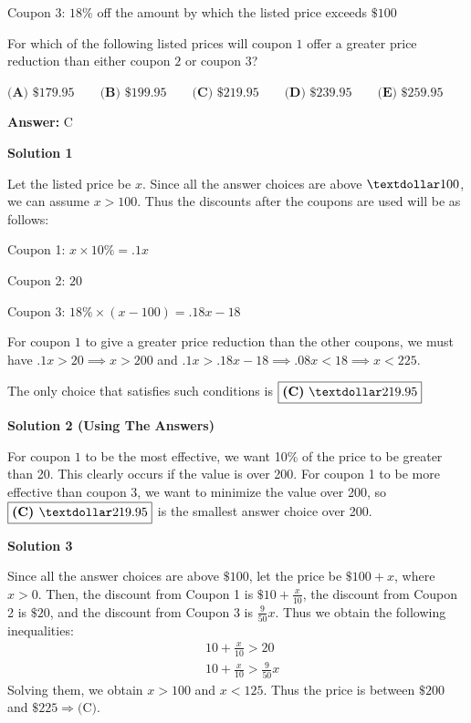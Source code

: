 \begin{enumerate}
 Coupon 3: $18\%$ off the amount by which the listed price exceeds $\$100$


 For which of the following listed prices will coupon $1$ offer a greater price reduction than either coupon $2$ or coupon $3$?


 $\textbf{(A) }\$179.95\qquad \textbf{(B) }\$199.95\qquad \textbf{(C) }\$219.95\qquad \textbf{(D) }\$239.95\qquad \textbf{(E) }\$259.95\qquad$

 \textbf{Answer: }C



\textbf{Solution 1}

Let the listed price be $x$. Since all the answer choices are above $\textdollar100$, we can assume $x > 100$. Thus the discounts after the coupons are used will be as follows:

 Coupon 1: $x\times10\%=.1x$

 Coupon 2: $20$

 Coupon 3: $18\%\times(x-100)=.18x-18$

 
For coupon $1$ to give a greater price reduction than the other coupons, we must have $.1x>20\implies x>200$ and $.1x>.18x-18\implies.08x<18\implies x<225$.

 The only choice that satisfies such conditions is $\boxed{\textbf{(C)}\ \textdollar219.95}$




\textbf{Solution 2 (Using The Answers)}

For coupon $1$ to be the most effective, we want 10\% of the price to be greater than 20. This clearly occurs if the value is over 200. For coupon 1 to be more effective than coupon 3, we want to minimize the value over 200, so $\boxed{\textbf{(C) }\textdollar219.95}$ is the smallest answer choice over 200.

 



\textbf{Solution 3}

Since all the answer choices are above $\$100$, let the price be $\$100 + x$, where $x > 0$. Then, the discount from Coupon 1 is $\$10 + \frac{x}{10}$, the discount from Coupon 2 is $\$20$, and the discount from Coupon 3 is $\frac{9}{50}x$. Thus we obtain the following inequalities: \begin{align*}&10 + \frac{x}{10} > 20 \\&10 + \frac{x}{10} > \frac{9}{50}x\end{align*}
Solving them, we obtain $x > 100$ and $x < 125$. Thus the price is between $\$200$ and $\$225\Rightarrow \boxed{\text{(C)}}$.


\end{enumerate}
